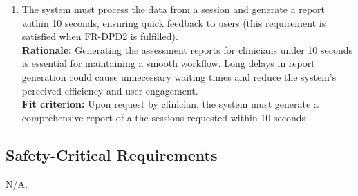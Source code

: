 \documentclass[12pt]{article}
\begin{document}
\begin{enumerate}[{PR-SL}4. ]
  \item The system must process the data from a session and generate a report within 10 seconds, ensuring quick feedback to users (this requirement is satisfied when FR-DPD2 is fulfilled).\\
  \textbf{Rationale: }Generating the assessment reports for clinicians under 10 seconds is essential for maintaining a smooth workflow. Long delays in report generation could cause unnecessary waiting times and reduce the system's perceived efficiency and user engagement.\\
  \textbf{Fit criterion: }Upon request by clinician, the system must generate a comprehensive report of a the sessions requested within 10 seconds  
\end{enumerate}

\subsection{Safety-Critical Requirements}
\color{red} N/A. \color{black}
\end{document}
